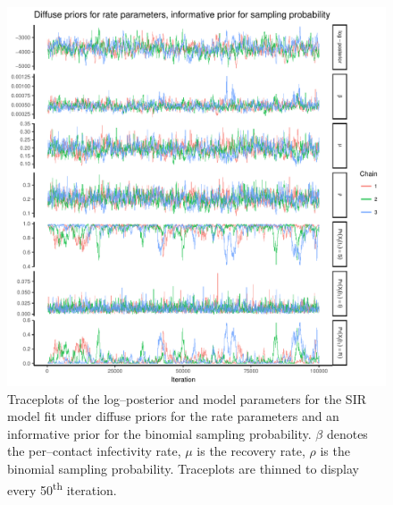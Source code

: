 \begin{figure}[htbp]
	\centering
	\includegraphics[width=0.9\linewidth]{figures/diffuse_informative_traceplots.pdf}
	\caption[Simuation 4 MCMC traceplots for SIR model parameters fit under informative priors for the measurement process and diffuse priors for rate parameters.]{Traceplots of the log--posterior and model parameters for the SIR model fit under diffuse priors for the rate parameters and an informative prior for the binomial sampling probability. $ \beta $ denotes the per--contact infectivity rate, $ \mu $ is the recovery rate, $ \rho $ is the binomial sampling probability. Traceplots are thinned to display every 50\textsuperscript{th} iteration.}
	\label{fig:diffuse_inform_traces}
\end{figure}

